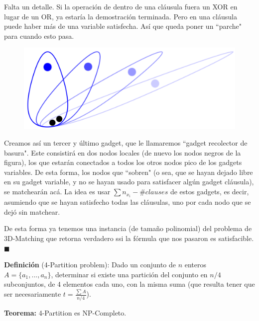 \documentclass{article}
\begin{document}
\bigskip

Falta un detalle. Si la operación de dentro de una cláusula fuera un XOR en lugar de un OR, ya estaría la demostración terminada. Pero en una cláusula puede haber más de una variable satisfecha. Así que queda poner un ``parche" para cuando esto pasa.




\begin{figure}[hp]
	\begin{center}
		\includegraphics[scale=0.1]{IMGs/3DM 3.png}	
	\end{center}
\end{figure}


Creamos así un tercer y último gadget, que le llamaremos ``gadget recolector de basura". Este consistirá en dos nodos locales (de nuevo los nodos negros de la figura), los que estarán conectados a todos los otros nodos pico de los gadgets variables. De esta forma, los nodos que ``sobren" (o sea, que se hayan dejado libre en su gadget variable, y no se hayan usado para satisfacer algún gadget cláusula), se matchearán acá. La idea es usar $\sum{n_{x_i}} - \#clauses$ de estos gadgets, es decir, asumiendo que se hayan satisfecho todas las cláusulas, uno por cada nodo que se dejó sin matchear.

\bigskip

De esta forma ya tenemos una instancia (de tamaño polinomial) del problema de 3D-Matching que retorna verdadero ssi la fórmula que nos pasaron es satisfacible. $\blacksquare$

\bigskip

\textbf{Definición} (4-Partition problem): Dado un conjunto de $n$ enteros $A = \{ a_1, ..., a_n \}$, determinar si existe una partición del conjunto en $n/4$ subconjuntos, de 4 elementos cada uno, con la misma suma (que resulta tener que ser necesariamente $t = \frac{\sum A}{n/4}$).

\bigskip

\textbf{Teorema:} 4-Partition es NP-Completo.
\end{document}
